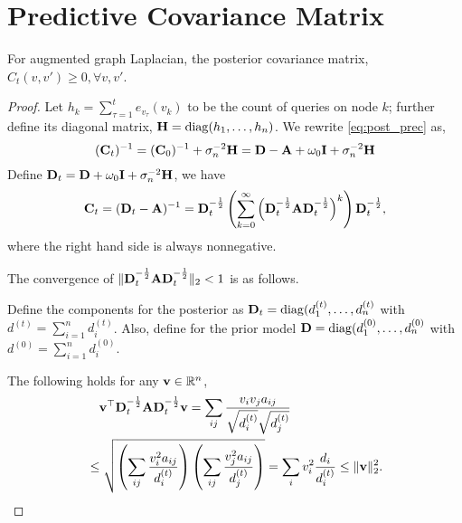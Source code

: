 


\section{Predictive Covariance Matrix}
\label{sec:appendix:cov}

   
   
   
   
\begin{lemma}
\label{lemma:nnC} 
  For augmented graph Laplacian, %
  the posterior covariance matrix, $C_t(v,v')\geq0, \forall v, v'$.
\end{lemma}%
\begin{proof}
  Let $h_k = \sum_{\tau=1}^t e_{v_\tau}(v_k)$ to be the count of queries on node $k$; further define its diagonal matrix, $\mathbf{H} = \operatorname{diag}(h_1,\dotsc,h_n)$. 
  We rewrite \eqref{eq:post_prec} as, %
\begin{equation*}
    ({\mathbf C}_t)^{-1} = ({\mathbf C}_0)^{-1} + \sigma_n^{-2}\mathbf{H}
    = {\mathbf D} - \mathbf A + \omega_0\mathbf I + \sigma_n^{-2}\mathbf{H}
  \end{equation*}
  Define ${\mathbf D}_t = {\mathbf D} + \omega_0\mathbf I + \sigma_n^{-2}\mathbf{H}$,
  we have
  \begin{align*}
    {\mathbf C}_t = ({\mathbf D}_t - \mathbf A)^{-1}
    =
    {\mathbf D}_t^{-\frac{1}{2}}
    \left(\sum_{k=0}^\infty \left({\mathbf D}_t^{-\frac{1}{2}}\mathbf A{\mathbf D}_t^{-\frac{1}{2}}\right)^k \right)
    {\mathbf D}_t^{-\frac{1}{2}}, 
  \end{align*}
where the right hand side is always nonnegative.

The convergence of $\|{\mathbf D}_t^{-\frac{1}{2}} \mathbf A {\mathbf D}_t^{-\frac{1}{2}}\|_2 < 1$ is as follows.

Define the components for the posterior as ${\mathbf D}_t = \operatorname{diag}(d_1^{(t)}, \dotsc, d_n^{(t)}$ with $d^{(t)} = \sum_{i=1}^n d_i^{(t)}$. Also, define for the prior model ${\mathbf D} = \operatorname{diag}(d_1^{(0)}, \dotsc, d_n^{(0)}$ with $d^{(0)} = \sum_{i=1}^n d_i^{(0)}$.

The following holds for any $\mathbf{v}\in\mathbb{R}^n$,
\begin{align*}
	&\quad \mathbf{v}^\top {\mathbf D}_t^{-\frac{1}{2}} \mathbf A {\mathbf D}_t^{-\frac{1}{2}} \mathbf{v} 
	= \sum_{ij}\frac{v_i v_j a_{ij}}{\sqrt{d^{(t)}_i}\sqrt{d^{(t)}_j}}
	\\
	&\leq 
	\sqrt{
		\left(  \sum_{ij} \frac{v_i^2 a_{ij}}{d^{(t)}_i}  \right)
		\left(  \sum_{ij} \frac{v_j^2 a_{ij}}{d^{(t)}_j}  \right)
	}
	=\sum_i v_i^2 \frac{d_i}{d^{(t)}_i}
	\leq \|\mathbf{v}\|_2^2.
\end{align*}


\end{proof}

